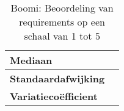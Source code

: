 \begin{table}[htbp]
{\begin{tabular}{|ll|}
    \multicolumn{1}{|l|}{\textbf{Mediaan}}                                                                                                                                                                                     &                              \\ \hline
    \multicolumn{1}{|l|}{\textbf{Standaardafwijking}}                                                                                                                                                                          &                              \\ \hline
    \multicolumn{1}{|l|}{\textbf{Variatiecoëfficient}}                                                                                                                                                                         &                              \\ \hline
    \end{tabular}%
    }
    \caption{Boomi: Beoordeling van requirements op een schaal van 1 tot 5}
    \end{table}
